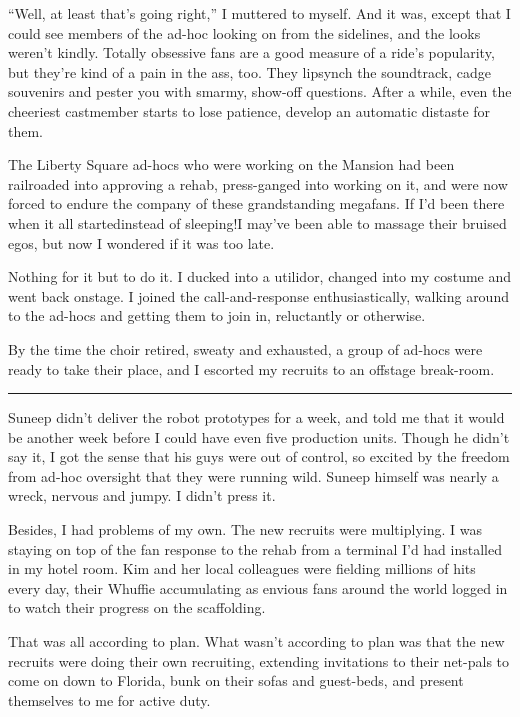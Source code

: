 “Well, at least that's going right,” I muttered to myself. And it
was, except that I could see members of the ad-hoc looking on from
the sidelines, and the looks weren't kindly. Totally obsessive fans
are a good measure of a ride's popularity, but they're kind of a
pain in the ass, too. They lipsynch the soundtrack, cadge souvenirs
and pester you with smarmy, show-off questions. After a while, even
the cheeriest castmember starts to lose patience, develop an
automatic distaste for them.

The Liberty Square ad-hocs who were working on the Mansion had been
railroaded into approving a rehab, press-ganged into working on it,
and were now forced to endure the company of these grandstanding
megafans. If I'd been there when it all started{\dash}instead of
sleeping!{\dash}I may've been able to massage their bruised egos, but now
I wondered if it was too late.

Nothing for it but to do it. I ducked into a utilidor, changed into
my costume and went back onstage. I joined the call-and-response
enthusiastically, walking around to the ad-hocs and getting them to
join in, reluctantly or otherwise.

By the time the choir retired, sweaty and exhausted, a group of
ad-hocs were ready to take their place, and I escorted my recruits
to an offstage break-room.

\begin{center}\rule{1in}{0.4pt}\end{center}

Suneep didn't deliver the robot prototypes for a week, and told me
that it would be another week before I could have even five
production units. Though he didn't say it, I got the sense that his
guys were out of control, so excited by the freedom from ad-hoc
oversight that they were running wild. Suneep himself was nearly a
wreck, nervous and jumpy. I didn't press it.

Besides, I had problems of my own. The new recruits were
multiplying. I was staying on top of the fan response to the rehab
from a terminal I'd had installed in my hotel room. Kim and her
local colleagues were fielding millions of hits every day, their
Whuffie accumulating as envious fans around the world logged in to
watch their progress on the scaffolding.

That was all according to plan. What wasn't according to plan was
that the new recruits were doing their own recruiting, extending
invitations to their net-pals to come on down to Florida, bunk on
their sofas and guest-beds, and present themselves to me for active
duty.

